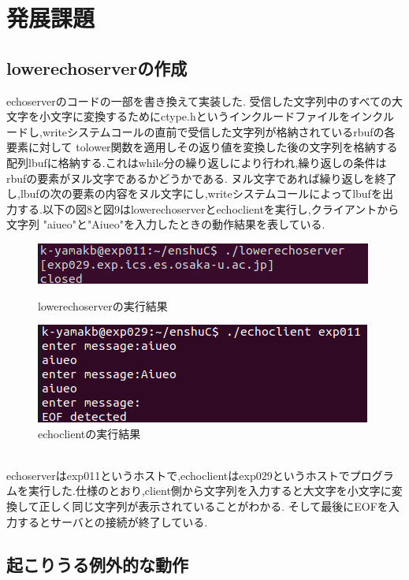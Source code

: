 \documentclass[dvipdfmx]{jarticle}
\begin{document}
\section{発展課題}
\subsection{lowerechoserverの作成}
echoserverのコードの一部を書き換えて実装した.
受信した文字列中のすべての大文字を小文字に変換するためにctype.hというインクルードファイルをインクルードし,writeシステムコールの直前で受信した文字列が格納されているrbufの各要素に対して
tolower関数を適用しその返り値を変換した後の文字列を格納する配列lbufに格納する.これはwhile分の繰り返しにより行われ,繰り返しの条件はrbufの要素がヌル文字であるかどうかである.
ヌル文字であれば繰り返しを終了し,lbufの次の要素の内容をヌル文字にし,writeシステムコールによってlbufを出力する.以下の図8と図9はlowerechoserverとechoclientを実行し,クライアントから文字列
"aiueo"と"Aiueo"を入力したときの動作結果を表している.
\begin{figure}[htbp]
    \begin{minipage}[b]{0.45\linewidth}
      \centering
      \includegraphics[keepaspectratio, scale=0.5]{3-1server.png}
      \caption{lowerechoserverの実行結果}
    \end{minipage}
    \begin{minipage}[b]{0.45\linewidth}
      \centering
      \includegraphics[keepaspectratio, scale=0.5]{3-1client.png}
      \caption{echoclientの実行結果}
    \end{minipage}
\end{figure}
\\echoserverはexp011というホストで,echoclientはexp029というホストでプログラムを実行した.仕様のとおり,client側から文字列を入力すると大文字を小文字に変換して正しく同じ文字列が表示されていることがわかる.
そして最後にEOFを入力するとサーバとの接続が終了している.
\subsection{起こりうる例外的な動作}
\end{document}
